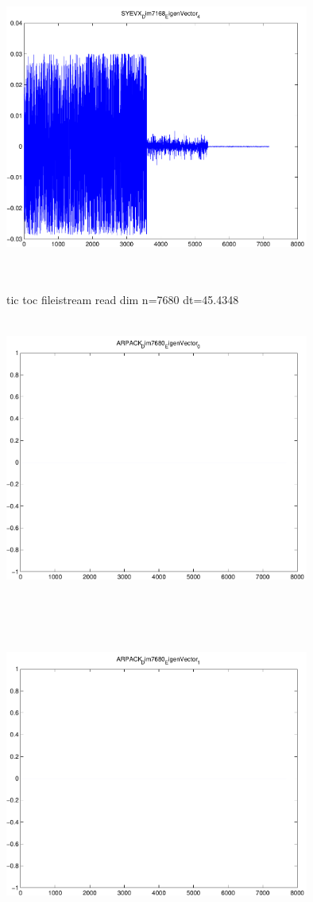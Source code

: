 \documentclass[9pt]{article}
\theoremstyle{plain}
\theoremstyle{definition}
\theoremstyle{remark}
\numberwithin{equation}{section}
\begin{document}
\includegraphics[width=10.0cm,height=10.0cm]{SYEVX_Dim7168_EigenVector_4.pdf}

tic toc fileistream read dim n=7680 dt=45.4348
\includegraphics[width=10.0cm,height=10.0cm]{ARPACK_Dim7680_EigenVector_0.pdf}

\includegraphics[width=10.0cm,height=10.0cm]{ARPACK_Dim7680_EigenVector_1.pdf}
\end{document}
